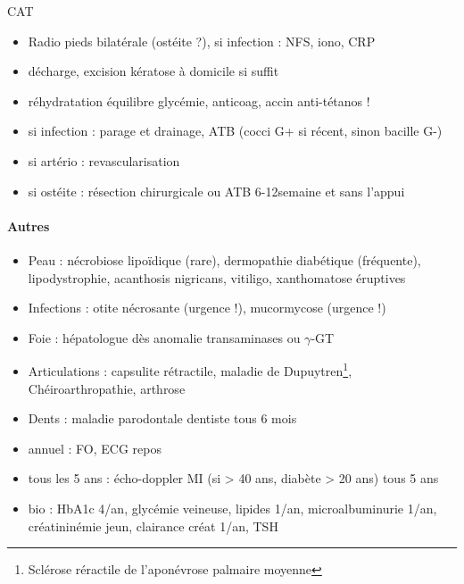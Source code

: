 \documentclass[11pt]{article}
\begin{document}
CAT
\begin{itemize}
\item Radio pieds bilatérale (ostéite ?), si infection : NFS, iono, CRP
\item décharge, excision kératose à domicile si suffit
\item réhydratation \textpm{} équilibre glycémie, anticoag, accin anti-tétanos !
\item si infection : parage et drainage, ATB (cocci G+ si récent, sinon bacille G-)
\item si artério : revascularisation
\item si ostéite : résection chirurgicale ou ATB 6-12semaine et sans l'appui
\end{itemize}

\paragraph{Autres}
\label{sec:orgac09c50}
\begin{itemize}
\item Peau : nécrobiose lipoïdique (rare), dermopathie diabétique (fréquente),
lipodystrophie, acanthosis nigricans, vitiligo, xanthomatose éruptives
\item Infections : otite nécrosante (urgence !), mucormycose (urgence !)
\item Foie : hépatologue dès anomalie transaminases ou \(\gamma\)-GT
\item Articulations : capsulite rétractile, maladie de Dupuytren\footnote{Sclérose réractile de l'aponévrose palmaire moyenne}, Chéiroarthropathie, arthrose
\item Dents : maladie parodontale \thus dentiste tous 6 mois
\end{itemize}

\begin{tcolorbox}
\begin{itemize}
 \item annuel : FO, ECG repos 
 \item tous les 5 ans : écho-doppler MI (si > 40 ans, diabète > 20 ans) tous 5 ans
 \item bio : HbA1c 4/an, glycémie veineuse, lipides 1/an, microalbuminurie 1/an,
   créatininémie jeun, clairance créat 1/an, TSH
\end{itemize}
\end{tcolorbox}
\end{document}
